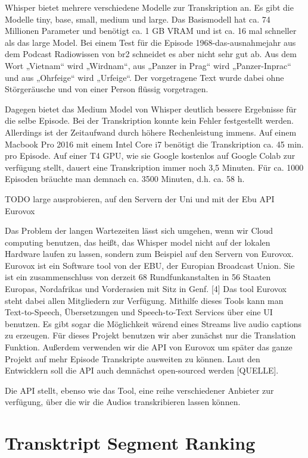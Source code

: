 Whisper bietet mehrere verschiedene Modelle zur Transkription an. Es gibt die Modelle tiny, base, small, medium und large. 
Das Basismodell hat ca. 74 Millionen Parameter und benötigt ca. 1 GB VRAM und ist ca. 16 mal schneller als das large Model. 
Bei einem Test für die Episode 1968-das-ausnahmejahr aus dem Podcast Radiowissen von br2 schneidet es aber nicht sehr gut ab. 
Aus dem Wort „Vietnam“ wird „Wirdnam“, aus „Panzer in Prag“ wird „Panzer-Inprac“ und aus  „Ohrfeige“ wird „Urfeige“. 
Der vorgetragene Text wurde dabei ohne Störgeräusche und von einer Person flüssig vorgetragen. 

Dagegen bietet das Medium Model von Whisper deutlich bessere Ergebnisse für die selbe Episode. 
Bei der Transkription konnte kein Fehler festgestellt werden. Allerdings ist der Zeitaufwand durch höhere Rechenleistung immens. 
Auf einem Macbook Pro 2016 mit einem Intel Core i7 benötigt die Transkription ca. 45 min. pro Episode. 
Auf einer T4 GPU, wie sie Google kostenlos auf Google Colab zur verfügung stellt, dauert eine Transkription immer noch 3,5 Minuten. 
Für ca. 1000 Episoden bräuchte man demnach ca. 3500 Minuten, d.h. ca. 58 h. 

TODO large ausprobieren, auf den Servern der Uni und mit der Ebu API
Eurovox

Das Problem der langen Wartezeiten lässt sich umgehen, wenn wir Cloud computing benutzen, das heißt, das Whisper model nicht auf der lokalen Hardware laufen zu lassen, sondern zum Beispiel auf den Servern von Eurovox. 
Eurovox ist ein Software tool von der EBU, der Europian Broadcast Union. 
Sie ist ein zusammenschluss von derzeit 68 Rundfunkanstalten in 56 Staaten Europas, Nordafrikas und Vorderasien mit Sitz in Genf. [4] 
Das tool Eurovox steht dabei allen Mitgliedern zur Verfügung.  
Mithilfe dieses Tools kann man Text-to-Speech, Übersetzungen und Speech-to-Text Services über eine UI benutzen. 
Es gibt sogar die Möglichkeit wärend eines Streams live audio captions zu erzeugen. 
Für dieses Projekt benutzen wir aber zunächst nur die Translation Funktion. 
Außerdem verwenden wir die API von Eurovox um später das ganze Projekt auf mehr Episode Transkripte ausweiten zu können. 
Laut den Entwicklern soll die API auch demnächst open-sourced werden [QUELLE].

Die API stellt, ebenso wie das Tool, eine reihe verschiedener Anbieter zur verfügung, über die wir die Audios transkribieren lassen können. 



\section{Transktript Segment Ranking}

